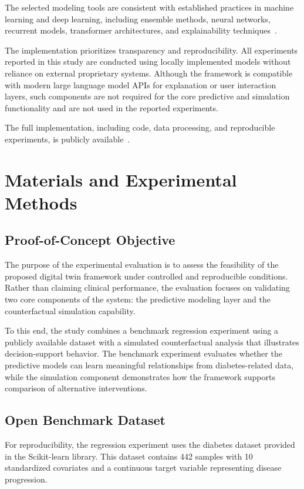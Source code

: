 \documentclass[journal]{IEEEtran}
\begin{document}
The selected modeling tools are consistent with established practices in machine learning and deep learning, including ensemble methods, neural networks, recurrent models, transformer architectures, and explainability techniques~\cite{ref28,ref29,ref30,ref31,ref32,ref35,ref36}.

The implementation prioritizes transparency and reproducibility. All experiments reported in this study are conducted using locally implemented models without reliance on external proprietary systems. Although the framework is compatible with modern large language model APIs for explanation or user interaction layers, such components are not required for the core predictive and simulation functionality and are not used in the reported experiments.

The full implementation, including code, data processing, and reproducible experiments, is publicly available~\cite{ref41}.

\section{Materials and Experimental Methods}
\subsection{Proof-of-Concept Objective}
The purpose of the experimental evaluation is to assess the feasibility of the proposed digital twin framework under controlled and reproducible conditions. Rather than claiming clinical performance, the evaluation focuses on validating two core components of the system: the predictive modeling layer and the counterfactual simulation capability.

To this end, the study combines a benchmark regression experiment using a publicly available dataset with a simulated counterfactual analysis that illustrates decision-support behavior. The benchmark experiment evaluates whether the predictive models can learn meaningful relationships from diabetes-related data, while the simulation component demonstrates how the framework supports comparison of alternative interventions.

\subsection{Open Benchmark Dataset}
For reproducibility, the regression experiment uses the diabetes dataset provided in the Scikit-learn library. This dataset contains 442 samples with 10 standardized covariates and a continuous target variable representing disease progression.
\end{document}
